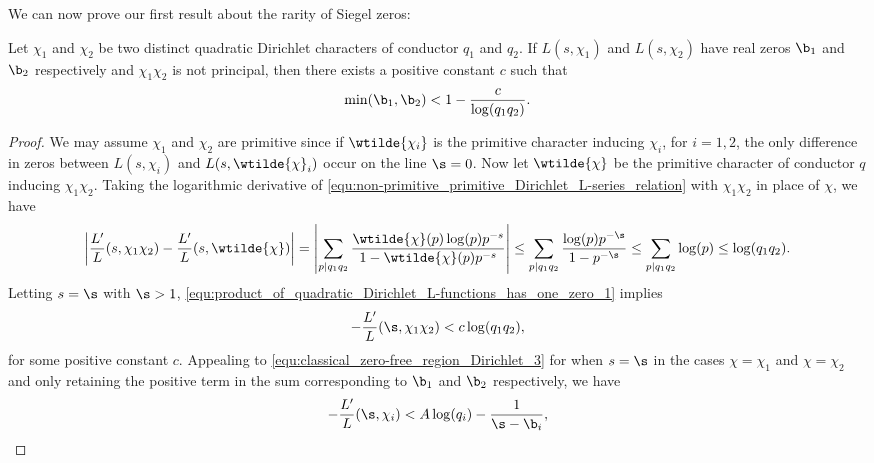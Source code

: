       We can now prove our first result about the rarity of Siegel zeros:

      \begin{proposition}\label{prop:product_of_quadratic_Dirichlet_L-functions_has_one_zero}
        Let $\chi_{1}$ and $\chi_{2}$ be two distinct quadratic Dirichlet characters of conductor $q_{1}$ and $q_{2}$. If $L(s,\chi_{1})$ and $L(s,\chi_{2})$ have real zeros $\b_{1}$ and $\b_{2}$ respectively and $\chi_{1}\chi_{2}$ is not principal, then there exists a positive constant $c$ such that
        \[
          \min(\b_{1},\b_{2}) < 1-\frac{c}{\log(q_{1}q_{2})}.
        \]
      \end{proposition}
      \begin{proof}
        We may assume $\chi_{1}$ and $\chi_{2}$ are primitive since if $\wtilde{\chi_{i}}$ is the primitive character inducing $\chi_{i}$, for $i = 1,2$, the only difference in zeros between $L(s,\chi_{i})$ and $L(s,\wtilde{\chi}_{i})$ occur on the line $\s = 0$. Now let $\wtilde{\chi}$ be the primitive character of conductor $q$ inducing $\chi_{1}\chi_{2}$. Taking the logarithmic derivative of \cref{equ:non-primitive_primitive_Dirichlet_L-series_relation} with $\chi_{1}\chi_{2}$ in place of $\chi$, we have
        \begin{equation}\label{equ:product_of_quadratic_Dirichlet_L-functions_has_one_zero_1}
          \left|\frac{L'}{L}(s,\chi_{1}\chi_{2})-\frac{L'}{L}(s,\wtilde{\chi})\right| = \left|\sum_{p \mid q_{1}q_{2}}\frac{\wtilde{\chi}(p)\log(p)p^{-s}}{1-\wtilde{\chi}(p)p^{-s}}\right| \le \sum_{p \mid q_{1}q_{2}}\frac{\log(p)p^{-\s}}{1-p^{-\s}} \le \sum_{p \mid q_{1}q_{2}}\log(p) \le \log(q_{1}q_{2}).
        \end{equation}
        Letting $s = \s$ with $\s > 1$, \cref{equ:product_of_quadratic_Dirichlet_L-functions_has_one_zero_1} implies
        \begin{equation}\label{equ:product_of_quadratic_Dirichlet_L-functions_has_one_zero_2}
          -\frac{L'}{L}(\s,\chi_{1}\chi_{2}) < c\log(q_{1}q_{2}),
        \end{equation}
        for some positive constant $c$.
        Appealing to \cref{equ:classical_zero-free_region_Dirichlet_3} for when $s = \s$ in the cases $\chi = \chi_{1}$ and $\chi = \chi_{2}$ and only retaining the positive term in the sum corresponding to $\b_{1}$ and $\b_{2}$ respectively, we have
        \begin{equation}\label{equ:product_of_quadratic_Dirichlet_L-functions_has_one_zero_3}
          -\frac{L'}{L}(\s,\chi_{i}) < A\log(q_{i})-\frac{1}{\s-\b_{i}},

\end{equation}
\end{proof}
